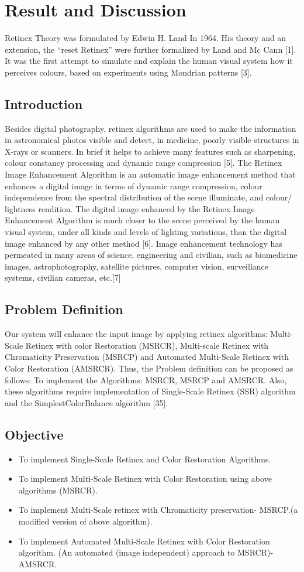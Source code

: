 \chapter{Result and Discussion}
Retinex Theory was formulated by Edwin H. Land In 1964. His theory and an extension, the “reset Retinex” were further formalized by Land and Mc Cann [1]. It was the first attempt to simulate and explain the human visual system how it perceives colours, based on experiments using Mondrian patterns [3].
\section{Introduction}
Besides digital photography, retinex algorithms are used to make the information in astronomical photos visible and detect, in medicine, poorly visible structures in X-rays or scanners. In brief it helps to achieve many features such as sharpening, colour constancy processing and dynamic range compression [5]. The Retinex Image Enhancement Algorithm is an automatic image enhancement method that enhances a digital image in terms of dynamic range compression, colour independence from the spectral distribution of the scene illuminate, and colour/ lightness rendition. The digital image enhanced by the Retinex Image Enhancement Algorithm is much closer to the scene perceived by the human visual system, under all kinds and levels of lighting variations, than the digital image enhanced by any other method [6]. Image enhancement technology has permeated in many areas of science, engineering and civilian, such as biomedicine images, astrophotography, satellite pictures, computer vision, surveillance systems, civilian cameras, etc.[7]

\section{Problem Definition}
Our system will enhance the input image by applying retinex algorithms: Multi-Scale Retinex with color Restoration (MSRCR), Multi-scale Retinex with Chromaticity Preservation (MSRCP) and Automated Multi-Scale Retinex with Color Restoration (AMSRCR). Thus, the Problem definition can be proposed as follows: To implement the Algorithms: MSRCR, MSRCP and AMSRCR. Also, these algorithms require implementation of Single-Scale Retinex (SSR) algorithm and the SimplestColorBalance algorithm [35].
\section{Objective}
	\begin{itemize}
		\item To implement Single-Scale Retinex and Color Restoration Algorithms.
		\item To implement Multi-Scale Retinex with Color Restoration using above 
		algorithms (MSRCR).
		\item To implement Multi-Scale retinex with Chromaticity preservation- MSRCP.(a 
		modified version of above algorithm).
		\item To implement Automated Multi-Scale Retinex with Color Restoration algorithm.	
		(An automated (image independent) approach to MSRCR)- AMSRCR.
	\end{itemize}
	
